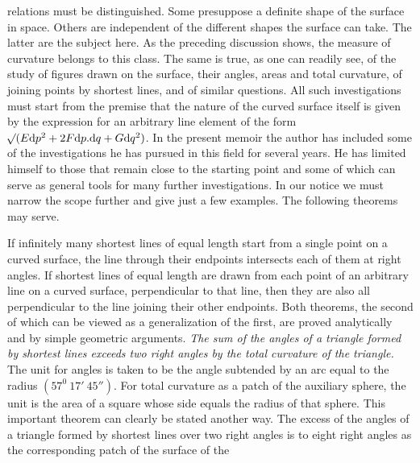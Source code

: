 %
relations must be distinguished. Some presuppose a definite shape of the surface in space. Others are independent of the different shapes the surface can take. The latter are the subject here. As the preceding discussion shows, the measure of curvature belongs to this class. The same is true, as one can readily see, of the study of figures drawn on the surface, their angles, areas and total curvature, of joining points by shortest lines, and of similar questions. All such investigations must start from the premise that the nature of the curved surface itself is given by the expression for an arbitrary line element of the form \(\mathord{{}^{}\!\surd}(E\mathrm{d}p^2+2F\mathrm{d}p\mathord{.}\mathrm{d}q+G\mathrm{d}q^2)\). In the present memoir the author has included some of the investigations he has pursued in this field for several years. He has limited himself to those that remain close to the starting point and some of which can serve as general tools for many further investigations. In our notice we must narrow the scope further and give just a few examples. The following theorems may serve.

If infinitely many shortest lines of equal length start from a single point on a curved surface, the line through their endpoints intersects each of them at right angles. If shortest lines of equal length are drawn from each point of an arbitrary line on a curved surface, perpendicular to that line, then they are also all perpendicular to the line joining their other endpoints. Both theorems, the second of which can be viewed as a generalization of the first, are proved analytically and by simple geometric arguments. \textit{The sum of the angles of a triangle formed by shortest lines exceeds two right angles by the total curvature of the triangle.} The unit for angles is taken to be the angle subtended by an arc equal to the radius \((57^0\ 17'\ 45'')\). For total curvature as a patch of the auxiliary sphere, the unit is the area of a square whose side equals the radius of that sphere. This important theorem can clearly be stated another way. The excess of the angles of a triangle formed by shortest lines over two right angles is to eight right angles as the corresponding patch of the surface of the %
